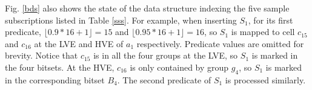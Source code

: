 \documentclass[runningheads]{llncs}
\begin{document}

Fig. \ref{bds} also shows the state of the data structure indexing the five sample subscriptions listed in Table \ref{sss}. For example, when inserting $S_1$, for its first predicate, $\lfloor0.9*16+1\rfloor=15$ and $\lfloor0.95*16+1\rfloor=16$, so $S_1$ is mapped to cell $c_{15}$ and $c_{16}$ at the LVE and HVE of $a_1$ respectively. Predicate values are omitted for brevity. Notice that $c_{15}$ is in all the four groups at the LVE, so $S_1$ is marked in the four bitsets. At the HVE, $c_{16}$ is only contained by group $g_4$, so $S_1$ is marked in the corresponding bitset $B_4$. The second predicate of $S_1$ is processed similarly.
\end{document}
